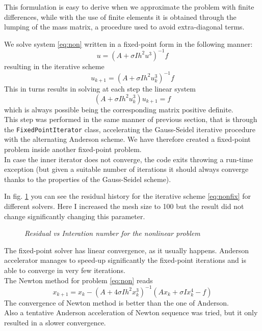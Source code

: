 \documentclass[12pt]{article}
\begin{document}
			This formulation is easy to derive when we approximate the problem with finite differences, while
			with the use of finite elements it is obtained through the lumping of the mass matrix, a procedure
			used to avoid extra-diagonal terms.
			
			We solve system \ref{eq:non} written in a fixed-point form in the following manner:
			\begin{equation}
				u = (A+ \sigma I h^2 u^3)^{-1} f 
			\end{equation}
			resulting in the iterative scheme
			\begin{equation}
				\label{eq:nonfix}
				u_{k+1}= (A+ \sigma I h^2 u^3_k)^{-1} f 
			\end{equation}
			This in turns results in solving at each step the linear system
			\begin{equation}
				(A+ \sigma I h^2 u^3_k) u_{k+1} = f
			\end{equation}
			which is always possible being the corresponding matrix positive definite.\\
			This step was performed in the same manner of previous section, that is through the
			\verb|FixedPointIterator| class, accelerating the Gauss-Seidel iterative procedure
			with the alternating Anderson scheme.
			We have therefore created a fixed-point problem inside another fixed-point problem.\\
			In case the inner iterator does not converge, the code exits throwing a run-time
			exception (but given a suitable number of iterations it should always converge
			thanks to the properties of the Gauss-Seidel scheme).
			
			In fig. \ref{fig:nonlinear} you can see the residual history for the iterative scheme \ref{eq:nonfix}
			for different solvers. Here I increased the mesh size to 100 but the result did not change significantly
			changing this parameter.
			\begin{figure}
				{\scriptsize
			}
			\centering
			\caption{\textit{Residual vs Interation number for the nonlinear problem}}
			\label{fig:nonlinear}
			\end{figure}
			The fixed-point solver has linear convergence, as it usually happens.
			Anderson accelerator manages to speed-up significantly the fixed-point iterations and is able
			to converge in very few iterations.\\
			The Newton method for problem \ref{eq:non} reads
			\begin{equation}
				x_{k+1}= x_k - (A+4 \sigma I h^2 x_k^3)^{-1}(A x_k + \sigma I x_k^4 - f)
			\end{equation}
			The convergence of Newton method is better than the one of Anderson.\\
			Also a tentative Anderson acceleration of Newton sequence was tried,
			but it only resulted in a slower convergence.
						
\end{document}
